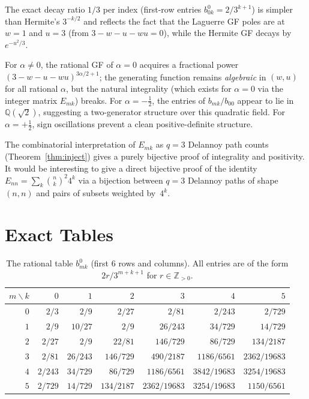 \documentclass[11pt,a4paper]{article}
\theoremstyle{definition}
\theoremstyle{plain}
\newcommand{\Z}{\mathbb{Z}}
\newcommand{\Q}{\mathbb{Q}}
\begin{document}
\noindent The exact decay ratio $1/3$ per index (first-row entries $b_{0k}^0 = 2/3^{k+1}$)
is simpler than Hermite's $3^{-k/2}$ and reflects the fact that the
Laguerre GF poles are at $w=1$ and $u=3$ (from $3-w-u-wu=0$), while
the Hermite GF decays by $e^{-u^2/3}$.

For $\alpha\ne 0$, the rational GF of $\alpha=0$ acquires a fractional
power $(3-w-u-wu)^{3\alpha/2+1}$; the generating function remains
\emph{algebraic} in $(w,u)$ for all rational $\alpha$, but the natural
integrality (which exists for $\alpha=0$ via the integer matrix $E_{mk}$)
breaks. For $\alpha=-\tfrac12$, the entries of $b_{mk}/b_{00}$ appear
to lie in $\Q(\sqrt{2})$, suggesting a two-generator structure over
this quadratic field. For $\alpha=+\tfrac12$, sign oscillations prevent
a clean positive-definite structure.

The combinatorial interpretation of $E_{mk}$ as $q=3$ Delannoy
path counts (Theorem~\ref{thm:inject}) gives a purely bijective proof
of integrality and positivity. It would be interesting to give a
direct bijective proof of the identity
$E_{nn} = \sum_k\binom{n}{k}^2 4^k$ via a bijection between
$q=3$ Delannoy paths of shape $(n,n)$ and pairs of subsets weighted by~$4^k$.

\appendix
\section{Exact Tables}

\begin{table}[ht]
\centering
\caption{The rational table $b_{mk}^0$ (first 6 rows and columns).
All entries are of the form $2r/3^{m+k+1}$ for $r\in\Z_{>0}$.}
\label{tab:bmk}
\small
\begin{tabular}{r|rrrrrr}
\toprule
$m\backslash k$ & $0$ & $1$ & $2$ & $3$ & $4$ & $5$ \\
\midrule
$0$ & $2/3$ & $2/9$ & $2/27$ & $2/81$ & $2/243$ & $2/729$ \\
$1$ & $2/9$ & $10/27$ & $2/9$ & $26/243$ & $34/729$ & $14/729$ \\
$2$ & $2/27$ & $2/9$ & $22/81$ & $146/729$ & $86/729$ & $134/2187$ \\
$3$ & $2/81$ & $26/243$ & $146/729$ & $490/2187$ & $1186/6561$ & $2362/19683$ \\
$4$ & $2/243$ & $34/729$ & $86/729$ & $1186/6561$ & $3842/19683$ & $3254/19683$ \\
$5$ & $2/729$ & $14/729$ & $134/2187$ & $2362/19683$ & $3254/19683$ & $1150/6561$ \\
\bottomrule
\end{tabular}
\end{table}
\end{document}
